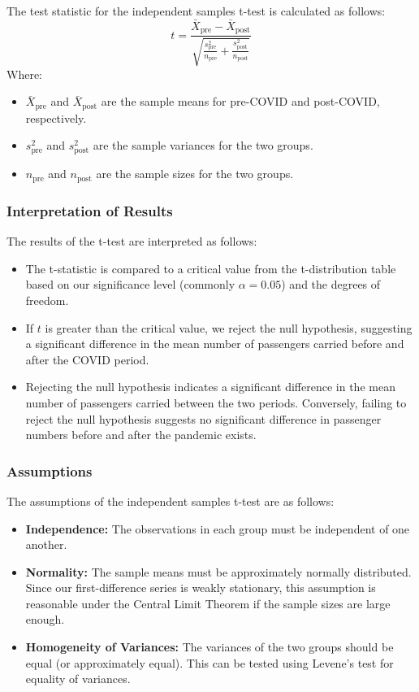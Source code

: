\documentclass{article}
\begin{document}
The test statistic for the independent samples t-test is calculated as follows:
\[
t = \frac{\bar{X}_{\text{pre}} - \bar{X}_{\text{post}}}{\sqrt{\frac{s_{\text{pre}}^2}{n_{\text{pre}}} + \frac{s_{\text{post}}^2}{n_{\text{post}}}}}
\]
Where:
\begin{itemize}
    \item \( \bar{X}_{\text{pre}} \) and \( \bar{X}_{\text{post}} \) are the sample means for pre-COVID and post-COVID, respectively.
    \item \( s_{\text{pre}}^2 \) and \( s_{\text{post}}^2 \) are the sample variances for the two groups.
    \item \( n_{\text{pre}} \) and \( n_{\text{post}} \) are the sample sizes for the two groups.
\end{itemize}

\subsubsection{Interpretation of Results}

The results of the t-test are interpreted as follows:

\begin{itemize}
\def\labelenumi{\roman{enumi}.}
\item
  The t-statistic is compared to a critical value from the
  t-distribution table based on our significance level (commonly $\alpha = 0.05$) and the degrees of freedom.
\item
 If $t$ is greater than the critical value, we reject the null hypothesis, suggesting a   significant difference in the mean number of passengers carried before and after the COVID period.
\item
  Rejecting the null hypothesis indicates a significant difference in
  the mean number of passengers carried between the two periods.
  Conversely, failing to reject the null hypothesis suggests no
  significant difference in passenger numbers before and after the
  pandemic exists.
\end{itemize}

\subsubsection{Assumptions}

The assumptions of the independent samples t-test are as follows:

\begin{itemize}
\item
  \textbf{Independence:} The observations in each group must be
  independent of one another.
\item
  \textbf{Normality:} The sample means must be approximately normally
  distributed. Since our first-difference series is weakly stationary,
  this assumption is reasonable under the Central Limit Theorem if the
  sample sizes are large enough.
\item
  \textbf{Homogeneity of Variances:} The variances of the two groups
  should be equal (or approximately equal). This can be tested using
  Levene's test for equality of variances.
\end{itemize}
\end{document}
